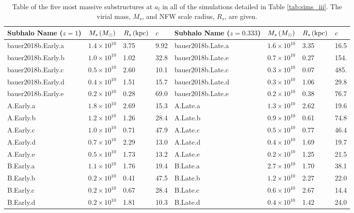 \begin{table}
\caption{Table of the five most massive substructures at $a_l$ in all
  of the simulations detailed in Table \ref{tab:sims_iii}. The virial
  mass, $M_s$, and NFW scale radius, $R_s$, are
  given.}\label{tab:substructure}
	\begin{tabular}{|l l l l | l l l l|}
	\hline
	Subhalo Name ($z=1$) & $M_s \,(M_\odot)$ & $R_s \, (\text{kpc})$ & $c$ & Subhalo Name ($z=0.333$) & $M_s \,(M_\odot)$ & $R_s \, (\text{kpc})$ & $c$\\	
	\hline
    bauer2018b.Early.a & $1.4 \times 10^{10}$ & 3.75 & 9.92 & bauer2018b.Late.a & $1.6 \times 10^{10}$ & 3.35 & 16.5 \\
    bauer2018b.Early.b & $1.0 \times 10^{10}$ & 1.02 & 32.8 & bauer2018b.Late.e & $0.7 \times 10^{10}$ & 0.27 & 154. \\
    bauer2018b.Early.c & $0.5 \times 10^{10}$ & 2.60 & 10.1 & bauer2018b.Late.c & $0.3 \times 10^{10}$ & 0.07 & 485. \\
    bauer2018b.Early.d & $0.4 \times 10^{10}$ & 1.51 & 15.7 & bauer2018b.Late.d & $0.3 \times 10^{10}$ & 1.06 & 29.8 \\
    bauer2018b.Early.e & $0.2 \times 10^{10}$ & 0.28 & 69.0 & bauer2018b.Late.e & $0.2 \times 10^{10}$ & 0.38 &  76.7\\
	\hline
	A.Early.a & $1.8 \times 10^{10}$ & 2.69 & 15.3 & A.Late.a & $1.3 \times 10^{10}$ & 2.62 & 19.6 \\
	A.Early.b & $1.2 \times 10^{10}$ & 1.26 & 28.4 & A.Late.b & $0.9 \times 10^{10}$ & 0.61 & 74.8 \\
	A.Early.c & $1.0 \times 10^{10}$ & 0.71 & 47.9 & A.Late.c & $0.5 \times 10^{10}$ & 0.77 & 46.4 \\
	A.Early.d & $0.7 \times 10^{10}$ & 2.29 & 13.0 & A.Late.d & $0.4 \times 10^{10}$ & 1.69 & 19.7 \\
	A.Early.e & $0.5 \times 10^{10}$ & 1.73 & 13.2 & A.Late.e & $0.2 \times 10^{10}$ & 1.25 & 21.5 \\
	\hline
	B.Early.a & $1.1 \times 10^{10}$ & 1.76 & 19.4 & B.Late.a & $2.7 \times 10^{10}$ & 1.70 & 38.1 \\
	B.Early.b & $0.2 \times 10^{10}$ & 0.41 & 47.5 & B.Late.b & $1.2 \times 10^{10}$ & 2.27 & 22.0 \\
	B.Early.c & $0.2 \times 10^{10}$ & 0.67 & 28.4 & B.Late.c & $0.6 \times 10^{10}$ & 2.67 & 14.4 \\
	B.Early.d & $0.2 \times 10^{10}$ & 1.81 & 10.3 & B.Late.d & $0.4 \times 10^{10}$ & 1.42 & 24.0 \\

\end{tabular}
\end{table}
